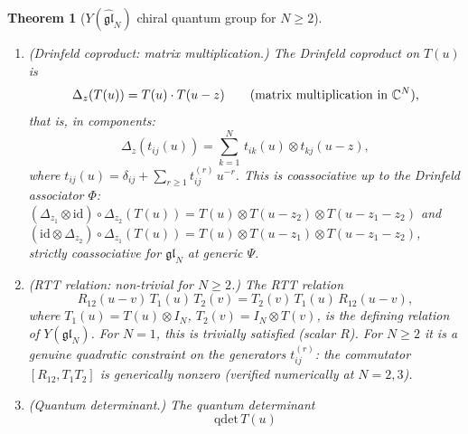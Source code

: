 \documentclass[11pt,reqno]{amsart}
\newtheorem{theorem}{Theorem}[section]
\theoremstyle{definition}
\theoremstyle{remark}
\newcommand{\CC}{\mathbb{C}}
\newcommand{\id}{\mathrm{id}}
\numberwithin{equation}{section}
\begin{document}
\begin{theorem}[$Y(\widehat{\mathfrak{gl}}_N)$ chiral
quantum group for $N \geq 2$]
\begin{enumerate}[label=\textup{(\Roman*)}]
  The Yang--Baxter equation
  \begin{equation}\label{eq:glN-ybe}
    R_{12}(u-v)\, R_{13}(u)\, R_{23}(v)
    = R_{23}(v)\, R_{13}(u)\, R_{12}(u-v)
  \end{equation}
  holds for all $N$ and all $\Psi$
  \textup{(}computed numerically at $N = 2, 3$ by
  \texttt{glN\_affine\_yangian\_chiral\_qg\_engine.py};
  proved algebraically in
  Molev~\textup{\cite{Molev07}},
  Chapter~$1$\textup{)}.
  At $N = 1$: $P = 1$ and $R(u) = u + \Psi$ is scalar,
  recovering the class-$G$ case of
  Theorem~\textup{\ref{thm:w-infty-chiral-qg}}.
\item \textup{(Drinfeld coproduct: matrix multiplication.)}
  The Drinfeld coproduct on $T(u)$ is
  \begin{equation}\label{eq:glN-drinfeld-coprod}
    \Delta_z(T(u)) = T(u) \cdot T(u - z)
    \qquad
    \textup{(matrix multiplication in $\CC^N$)},
  \end{equation}
  that is, in components:
  \begin{equation}\label{eq:glN-coprod-components}
    \Delta_z(t_{ij}(u))
    = \sum_{k=1}^{N}\,
    t_{ik}(u) \otimes t_{kj}(u - z),
  \end{equation}
  where $t_{ij}(u) = \delta_{ij} + \sum_{r \geq 1}
  t_{ij}^{(r)}\, u^{-r}$.
  This is coassociative
  up to the Drinfeld associator $\Phi$:
  $(\Delta_{z_1} \otimes \id) \circ \Delta_{z_2}(T(u))
  = T(u) \otimes T(u - z_2) \otimes T(u - z_1 - z_2)$
  and
  $(\id \otimes \Delta_{z_2}) \circ \Delta_{z_1}(T(u))
  = T(u) \otimes T(u - z_1) \otimes T(u - z_1 - z_2)$,
  strictly coassociative for $\mathfrak{gl}_N$
  at generic $\Psi$.
\item \textup{(RTT relation: non-trivial for $N \geq 2$.)}
  The RTT relation
  \begin{equation}\label{eq:glN-rtt}
    R_{12}(u - v)\, T_1(u)\, T_2(v)
    = T_2(v)\, T_1(u)\, R_{12}(u - v),
  \end{equation}
  where $T_1(u) = T(u) \otimes I_N$,
  $T_2(v) = I_N \otimes T(v)$, is the defining relation of
  $Y(\mathfrak{gl}_N)$.
  For $N = 1$, this is trivially satisfied
  \textup{(}scalar $R$\textup{)}. For $N \geq 2$ it is a
  genuine quadratic constraint on the generators
  $t_{ij}^{(r)}$: the commutator $[R_{12}, T_1 T_2]$
  is generically nonzero
  \textup{(}verified numerically at $N = 2, 3$\textup{)}.
\item \textup{(Quantum determinant.)}
  The quantum determinant
  \begin{equation}\label{eq:glN-qdet}
    \mathrm{qdet}\, T(u)

\end{equation}
\end{enumerate}
\end{theorem}
\end{document}
